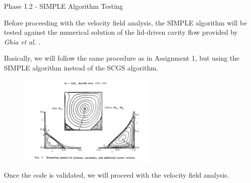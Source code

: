 \begin{frame}{Phase 1.2 - SIMPLE Algorithm Testing}

    Before proceeding with the velocity field analysis, the SIMPLE algorithm will be tested against the numerical solution of the lid-driven cavity flow provided by \textit{Ghia et al.} \cite{Ghia1982HighReSF}.

    Basically, we will follow the same procedure as in Assignment 1, but using the SIMPLE algorithm instead of the SCGS algorithm.

    \begin{figure}
        \centering
        \includegraphics[width=0.6\textwidth]{img/ghia_solution_Re1000.png}
    \end{figure}

    Once the code is validated, we will proceed with the velocity field analysis.

\end{frame}



